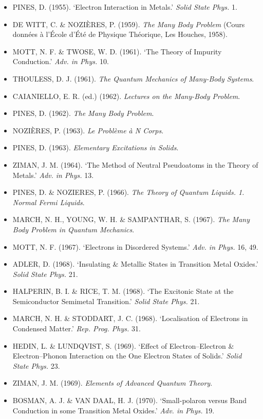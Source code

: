 \begin{itemize}[leftmargin=2em, itemsep=0.2em]
\item PINES, D. (1955). `Electron Interaction in Metals.' \emph{Solid State Phys.} 1.
\item DE WITT, C. \& NOZIÈRES, P. (1959). \emph{The Many Body Problem} (Cours données à l'École d'Été de Physique Théorique, Les Houches, 1958).
\item MOTT, N. F. \& TWOSE, W. D. (1961). `The Theory of Impurity Conduction.' \emph{Adv. in Phys.} 10.
\item THOULESS, D. J. (1961). \emph{The Quantum Mechanics of Many-Body Systems}.
\item CAIANIELLO, E. R. (ed.) (1962). \emph{Lectures on the Many-Body Problem}.
\item PINES, D. (1962). \emph{The Many Body Problem}.
\item NOZIÈRES, P. (1963). \emph{Le Problème à N Corps}.
\item PINES, D. (1963). \emph{Elementary Excitations in Solids}.
\item ZIMAN, J. M. (1964). `The Method of Neutral Pseudoatoms in the Theory of Metals.' \emph{Adv. in Phys.} 13.
\item PINES, D. \& NOZIERES, P. (1966). \emph{The Theory of Quantum Liquids. 1. Normal Fermi Liquids}.
\item MARCH, N. H., YOUNG, W. H. \& SAMPANTHAR, S. (1967). \emph{The Many Body Problem in Quantum Mechanics}.
\item MOTT, N. F. (1967). `Electrons in Disordered Systems.' \emph{Adv. in Phys.} 16, 49.
\item ADLER, D. (1968). `Insulating \& Metallic States in Transition Metal Oxides.' \emph{Solid State Phys.} 21.
\item HALPERIN, B. I. \& RICE, T. M. (1968). `The Excitonic State at the Semiconductor Semimetal Transition.' \emph{Solid State Phys.} 21.
\item MARCH, N. H. \& STODDART, J. C. (1968). `Localisation of Electrons in Condensed Matter.' \emph{Rep. Prog. Phys.} 31.
\item HEDIN, L. \& LUNDQVIST, S. (1969). `Effect of Electron--Electron \& Electron--Phonon Interaction on the One Electron States of Solids.' \emph{Solid State Phys.} 23.
\item ZIMAN, J. M. (1969). \emph{Elements of Advanced Quantum Theory}.
\item BOSMAN, A. J. \& VAN DAAL, H. J. (1970). `Small-polaron versus Band Conduction in some Transition Metal Oxides.' \emph{Adv. in Phys.} 19.
\end{itemize}

